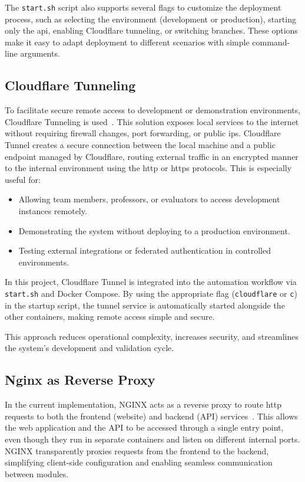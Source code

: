 The \texttt{start.sh} script also supports several flags to customize the deployment process, such as selecting the environment (development or production), starting only the api, enabling Cloudflare tunneling, or switching branches. These options make it easy to adapt deployment to different scenarios with simple command-line arguments.

\subsection{Cloudflare Tunneling} \label{subsec:cloudflare_tunneling}

To facilitate secure remote access to development or demonstration environments, Cloudflare Tunneling is used~\cite{cloudflare-tunnel-docs}. This solution exposes local services to the internet without requiring firewall changes, port forwarding, or public \ac{ip}s. Cloudflare Tunnel creates a secure connection between the local machine and a public endpoint managed by Cloudflare, routing external traffic in an encrypted manner to the internal environment using the \ac{http} or \ac{https} protocols. This is especially useful for:

\begin{itemize}
    \item Allowing team members, professors, or evaluators to access development instances remotely.
    \item Demonstrating the system without deploying to a production environment.
    \item Testing external integrations or federated authentication in controlled environments.
\end{itemize}

In this project, Cloudflare Tunnel is integrated into the automation workflow via \texttt{start.sh} and Docker Compose. By using the appropriate flag (\texttt{cloudflare} or \texttt{c}) in the startup script, the tunnel service is automatically started alongside the other containers, making remote access simple and secure.

This approach reduces operational complexity, increases security, and streamlines the system's development and validation cycle.

\subsection{Nginx as Reverse Proxy} \label{subsec:nginx_reverse_proxy}

In the current implementation, NGINX acts as a reverse proxy to route \ac{http} requests to both the frontend (website) and backend (API) services~\cite{nginx-docs}. This allows the web application and the API to be accessed through a single entry point, even though they run in separate containers and listen on different internal ports. NGINX transparently proxies requests from the frontend to the backend, simplifying client-side configuration and enabling seamless communication between modules.

